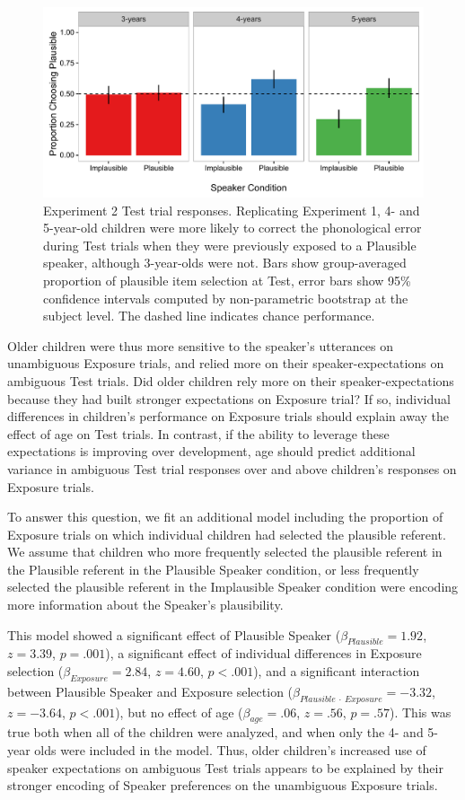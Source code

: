 \documentclass[man,floatsintext]{apa6}
\begin{document}
\begin{figure}[tb]
     \centering
     \includegraphics[width=.95\textwidth]{figures/exp2_results.pdf}
    \caption{Experiment 2 Test trial responses. Replicating Experiment 1, 4- and 5-year-old children were more likely to correct the phonological error during Test trials when they were previously exposed to a Plausible speaker, although 3-year-olds were not. Bars show group-averaged proportion of plausible item selection at Test, error bars show 95\% confidence intervals computed by non-parametric bootstrap at the subject level. The dashed line indicates chance performance.}%
   \label{fig:exp2_results}
\end{figure}

Older children were thus more sensitive to the speaker's utterances on unambiguous Exposure trials, and relied more on their speaker-expectations on ambiguous Test trials. Did older children rely more on their speaker-expectations because they had built stronger expectations on Exposure trial? If so, individual differences in children's performance on Exposure trials should explain away the effect of age on Test trials. In contrast, if the ability to leverage these expectations is improving over development, age should predict additional variance in ambiguous Test trial responses over and above children's responses on Exposure trials.

To answer this question, we fit an additional model including the proportion of Exposure trials on which individual children had selected the plausible referent. We assume that children who more frequently selected the plausible referent in the Plausible referent in the Plausible Speaker condition, or less frequently selected the plausible referent in the Implausible Speaker condition were encoding more information about the Speaker's plausibility. 

This model showed a significant effect of Plausible Speaker ($\beta_{Plausible} = 1.92$, $z = 3.39$, $p = .001$), a significant effect of individual differences in Exposure selection ($\beta_{Exposure} = 2.84$, $z = 4.60$, $p < .001$), and a significant interaction between Plausible Speaker and Exposure selection ($\beta_{Plausible \: \cdot \: Exposure} = -3.32$, $z = -3.64$, $p < .001$), but no effect of age ($\beta_{age} = .06$, $z = .56$, $p = .57$). This was true both when all of the children were analyzed, and when only the 4- and 5- year olds were included in the model. Thus, older children's increased use of speaker expectations on ambiguous Test trials appears to be explained by their stronger encoding of Speaker preferences on the unambiguous Exposure trials.  
\end{document}
